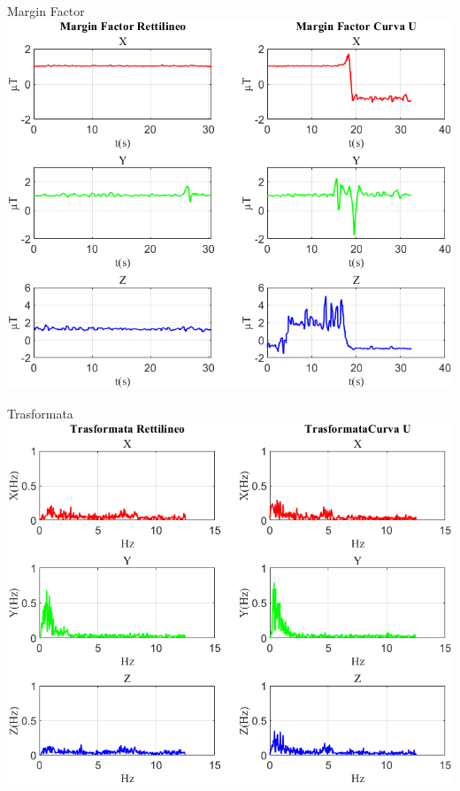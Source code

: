 \documentclass[beamer]{standalone}
\begin{document}
	\begin{frame}{{Margin Factor}}
		\centering\includegraphics[height=.8\textheight]{figure/Mag/Margin Factor}
	\end{frame}
	
	\begin{frame}{{Trasformata}}
		\centering\includegraphics[height=.8\textheight]{figure/Mag/Trasformata/Trasformata}
	\end{frame}
	
\end{document}

